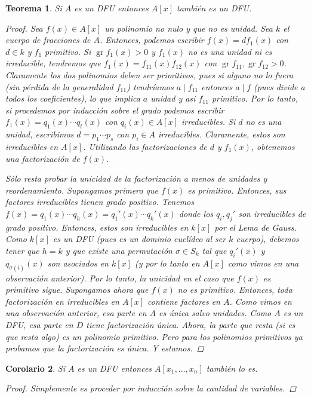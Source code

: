 \documentclass[12pt]{book}
\newtheorem{teo}{Teorema}[section]
\newtheorem{cor}[teo]{Corolario}
\theoremstyle{definition}
\DeclareMathOperator{\gr}{gr}
\begin{document}
\begin{teo}
Si $A$ es un DFU entonces $A[x]$ también es un DFU.
\begin{proof}

Sea $f(x)\in A[x]$ un polinomio no nulo y que no es unidad. Sea $k$ el cuerpo de fracciones de $A$. Entonces, podemos escribir $f(x) = d f_1(x)$ con $d\in k$ y $f_1$ primitivo. Si $\gr f_1(x) >0$ y $f_1(x)$ no es una unidad ni es irreducible, tendremos que $f_1(x) = f_{11}(x)f_{12}(x)$ con $\gr f_{11},\gr f_{12} > 0$. Claramente los dos polinomios deben ser primitivos, pues si alguno no lo fuera (sin pérdida de la generalidad $f_{11}$) tendríamos $a\mid f_{11}$ entonces $a\mid f$ (pues divide a todos los coeficientes), lo que implica $a$ unidad y así $f_{11}$ primitivo. Por lo tanto, si procedemos por inducción sobre el grado podemos escribir $f_1(x) = q_1(x)\cdots q_t(x)$ con $q_i(x)\in A[x]$ irreducibles. Si $d$ no es una unidad, escribimos $d=p_1\cdots p_s$ con $p_i\in A$ irreducibles. Claramente, estos son irreducibles en $A[x]$. Utilizando las factorizaciones de $d$ y $f_1(x)$, obtenemos una factorización de $f(x)$. 

Sólo resta probar la unicidad de la factorización a menos de unidades y reordenamiento. Supongamos primero que $f(x)$ es primitivo. Entonces, sus factores irreducibles tienen grado positivo. Tenemos $f(x) = q_1(x)\cdots q_h(x) = q_1'(x)\cdots  q_k'(x)$ donde los $q_i,q_j'$ son irreducibles de grado positivo. Entonces, estos son irreducibles en $k[x]$ por el Lema de Gauss. Como $k[x]$ es un DFU (pues es un dominio euclídeo al ser $k$ cuerpo), debemos tener que $h=k$ y que existe una permutación $\sigma\in S_k$ tal que $q_i'(x)$ y  $q_{\sigma(i)}(x)$ son asociados en $k[x]$ (y por lo tanto en $A[x]$ como vimos en una observación anterior). Por lo tanto, la unicidad en el caso que $f(x)$ es primitivo sigue. Supongamos ahora que $f(x)$ no es primitivo. Entonces, toda factorización en irreducibles en $A[x]$ contiene factores en $A$. Como vimos en una observación anterior, esa parte en $A$ es única salvo unidades. Como $A$ es un DFU, esa parte en $D$ tiene factorización única. Ahora, la parte que resta (si es que resta algo) es un polinomio primitivo. Pero para los polinomios primitivos ya probamos que la factorización es única. Y estamos. 

\end{proof}
\end{teo}

\begin{cor}
Si $A$ es un DFU entonces $A[x_1,\ldots , x_n]$ también lo es.
\begin{proof}
Simplemente es proceder por inducción sobre la cantidad de variables.
\end{proof}
\end{cor}
\end{document}
